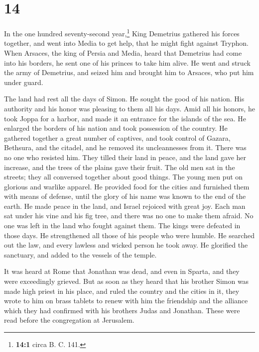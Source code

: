 \hypertarget{section-13}{%
\section{14}\label{section-13}}

 In the one hundred seventy-second year,\footnote{\textbf{14:1}
  circa B. C. 141.} King Demetrius gathered his forces together, and
went into Media to get help, that he might fight against Tryphon.
 When Arsaces, the king of Persia and Media, heard that
Demetrius had come into his borders, he sent one of his princes to take
him alive.  He went and struck the army of Demetrius, and
seized him and brought him to Arsaces, who put him under guard.

 The land had rest all the days of Simon. He sought the
good of his nation. His authority and his honor was pleasing to them all
his days.  Amid all his honors, he took Joppa for a
harbor, and made it an entrance for the islands of the sea.
 He enlarged the borders of his nation and took possession
of the country.  He gathered together a great number of
captives, and took control of Gazara, Bethsura, and the citadel, and he
removed its uncleannesses from it. There was no one who resisted him.
 They tilled their land in peace, and the land gave her
increase, and the trees of the plains gave their fruit. 
The old men sat in the streets; they all conversed together about good
things. The young men put on glorious and warlike apparel.
 He provided food for the cities and furnished them with
means of defense, until the glory of his name was known to the end of
the earth.  He made peace in the land, and Israel
rejoiced with great joy.  Each man sat under his vine and
his fig tree, and there was no one to make them afraid. 
No one was left in the land who fought against them. The kings were
defeated in those days.  He strengthened all those of his
people who were humble. He searched out the law, and every lawless and
wicked person he took away.  He glorified the sanctuary,
and added to the vessels of the temple.

 It was heard at Rome that Jonathan was dead, and even in
Sparta, and they were exceedingly grieved.  But as soon
as they heard that his brother Simon was made high priest in his place,
and ruled the country and the cities in it,  they wrote
to him on brass tablets to renew with him the friendship and the
alliance which they had confirmed with his brothers Judas and Jonathan.
 These were read before the congregation at Jerusalem.

